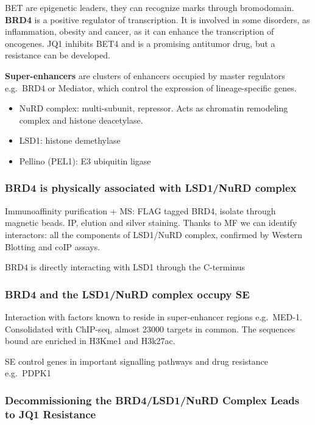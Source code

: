 BET are epigenetic leaders, they can recognize marks through
bromodomain. \textbf{BRD4} is a positive regulator of transcription. It
is involved in some disorders, as inflammation, obesity and cancer, as
it can enhance the transcription of oncogenes. JQ1 inhibits BET4 and is
a promising antitumor drug, but a resistance can be developed.

\textbf{Super-enhancers} are clusters of enhancers occupied by master
regulators e.g.~BRD4 or Mediator, which control the expression of
lineage-specific genes.

\begin{itemize}
\tightlist
\item
  NuRD complex: multi-subunit, repressor. Acts as chromatin remodeling
  complex and histone deacetylase.
\item
  LSD1: histone demethylase
\item
  Pellino (PEL1): E3 ubiquitin ligase
\end{itemize}

\hypertarget{brd4-is-physically-associated-with-lsd1nurd-complex}{%
\subsubsection{BRD4 is physically associated with LSD1/NuRD
complex}\label{brd4-is-physically-associated-with-lsd1nurd-complex}}

Immunoaffinity purification + MS: FLAG tagged BRD4, isolate through
magnetic beads. IP, elution and silver staining. Thanks to MF we can
identify interactors: all the components of LSD1/NuRD complex, confirmed
by Western Blotting and coIP assays.

BRD4 is directly interacting with LSD1 through the C-terminus

\hypertarget{brd4-and-the-lsd1nurd-complex-occupy-se}{%
\subsubsection{BRD4 and the LSD1/NuRD complex occupy
SE}\label{brd4-and-the-lsd1nurd-complex-occupy-se}}

Interaction with factors known to reside in super-enhancer regions
e.g.~MED-1. Consolidated with ChIP-seq, almost 23000 targets in common.
The sequences bound are enriched in H3Kme1 and H3k27ac.

SE control genes in important signalling pathways and drug resistance
e.g.~PDPK1

\hypertarget{decommissioning-the-brd4lsd1nurd-complex-leads-to-jq1-resistance}{%
\subsubsection{Decommissioning the BRD4/LSD1/NuRD Complex Leads to JQ1
Resistance}\label{decommissioning-the-brd4lsd1nurd-complex-leads-to-jq1-resistance}}

